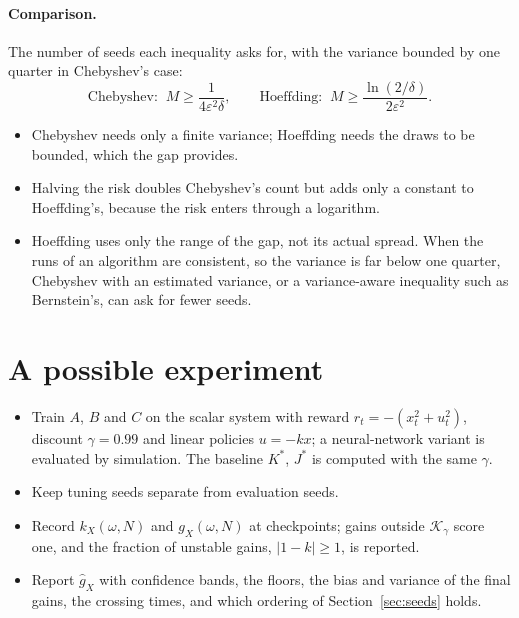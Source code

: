\documentclass[11pt]{article}
\begin{document}
\paragraph{Comparison.} The number of seeds each inequality asks for, with the variance bounded by one
quarter in Chebyshev's case:
\[
  \text{Chebyshev: } \ M \ge \frac{1}{4 \varepsilon^2 \delta}, \qquad
  \text{Hoeffding: } \ M \ge \frac{\ln(2/\delta)}{2 \varepsilon^2} .
\]
\begin{itemize}[leftmargin=*]
  \item Chebyshev needs only a finite variance; Hoeffding needs the draws to be bounded, which the gap
    provides.
  \item Halving the risk doubles Chebyshev's count but adds only a constant to Hoeffding's, because
    the risk enters through a logarithm.
  \item Hoeffding uses only the range of the gap, not its actual spread. When the runs of an algorithm
    are consistent, so the variance is far below one quarter, Chebyshev with an estimated variance, or
    a variance-aware inequality such as Bernstein's, can ask for fewer seeds.
\end{itemize}

\section{A possible experiment}

\begin{itemize}[leftmargin=*]
  \item Train $A$, $B$ and $C$ on the scalar system with reward $r_t = -(x_t^2 + u_t^2)$, discount
    $\gamma = 0.99$ and linear policies $u = -kx$; a neural-network variant is evaluated by
    simulation. The baseline $K^*$, $J^*$ is computed with the same $\gamma$.
  \item Keep tuning seeds separate from evaluation seeds.
  \item Record $k_X(\omega, N)$ and $g_X(\omega, N)$ at checkpoints; gains outside
    $\mathcal{K}_\gamma$ score one, and the fraction of unstable gains, $|1 - k| \ge 1$, is reported.
  \item Report $\hat g_X$ with confidence bands, the floors, the bias and variance of the final gains,
    the crossing times, and which ordering of Section~\ref{sec:seeds} holds.
\end{itemize}
\end{document}
